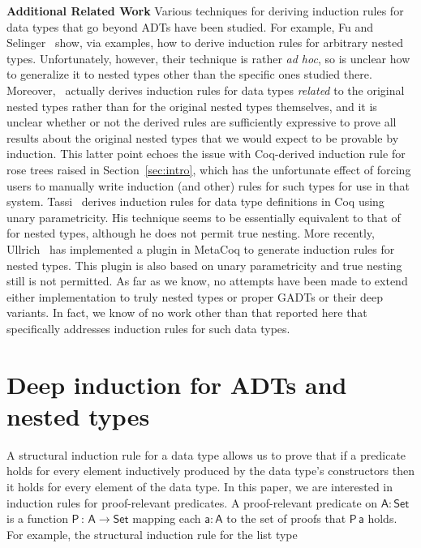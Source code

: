\documentclass[9pt]{entcs}
\begin{document}
\vspace*{0.05in}

{\bf Additional Related Work\/} Various techniques for deriving
induction rules for data types that go beyond ADTs have been
studied. For example, Fu and Selinger~\cite{fs18} show, via examples,
how to derive induction rules for arbitrary nested
types. Unfortunately, however, their technique is rather {\em ad hoc},
so is unclear how to generalize it to nested types other than the
specific ones studied there. Moreover,~\cite{fs18} actually derives
induction rules for data types {\em related} to the original nested
types rather than for the original nested types themselves, and it is
unclear whether or not the derived rules are sufficiently expressive
to prove all results about the original nested types that we would
expect to be provable by induction. This latter point echoes the issue
with Coq-derived induction rule for rose trees raised in
Section~\ref{sec:intro}, which has the unfortunate effect of forcing
users to manually write induction (and other) rules for such types for
use in that system. Tassi~\cite{tas19} derives induction rules for
data type definitions in Coq using unary parametricity. His technique
seems to be essentially equivalent to that of~\cite{jp19} for nested
types, although he does not permit true nesting. More recently,
Ullrich~\cite{ull20} has implemented a plugin in MetaCoq to generate
induction rules for nested types. This plugin is also based on unary
parametricity and true nesting still is not permitted.  As far as we
know, no attempts have been made to extend either implementation to
truly nested types or proper GADTs or their deep variants. In fact, we
know of no work other than that reported here that specifically
addresses induction rules for such data types.

\section{Deep induction for ADTs and nested types}\label{sec:ADTs-and-nesteds}

A structural induction rule for a data type allows us to prove that if
a predicate holds for every element inductively produced by the data
type's constructors then it holds for every element of the data type.
In this paper, we are interested in induction rules for proof-relevant
predicates.  A proof-relevant predicate on $\mathsf{A : Set}$ is a
function $\mathsf{P\,:\,A \to Set}$ mapping each $\mathsf{a : A}$ to
the set of proofs that $\mathsf{P\,a}$ holds.  For example, the
structural induction rule for the list type
\end{document}
